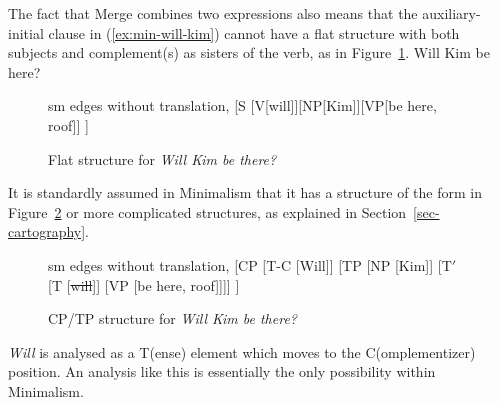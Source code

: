 \documentclass[output=paper]{langsci/langscibook}
\begin{document}
The fact that Merge combines two expressions also means that the auxiliary-initial clause in (\ref{ex:min-will-kim}) cannot have a flat structure with both subjects and complement(s) as sisters of the verb, as in Figure~\ref{fig:will-kim}.
\ea
Will Kim be here?\label{ex:min-will-kim}
\z
\begin{figure}
	\centering
	\begin{forest} sm edges without translation, 
		[S
		[V[will]][NP[Kim]][VP[be here, roof]]
		]
	\end{forest}
	\caption{\label{fig:will-kim}Flat structure for \emph{Will Kim be there?}}
\end{figure}
It is standardly assumed in Minimalism that it has a structure of the form in
Figure~\ref{fig:will-kim-b} or more complicated structures, as explained in Section~\ref{sec-cartography}.
%
\begin{figure}
	\centering
	\begin{forest} sm edges without translation, 
		[CP
		[T-C [Will]] 
		[TP [NP [Kim]]
			[T$'$ [T [\sout{will}]]
			[VP [be here, roof]]]]
		]
	\end{forest}
	\caption{\label{fig:will-kim-b}CP/TP structure for \emph{Will Kim be there?}}
\end{figure}
%
\emph{Will} is analysed as a T(ense) element which moves to the C(omplementizer) position. An
analysis like this is essentially the only possibility within Minimalism. 
\end{document}
